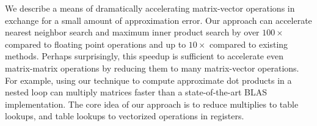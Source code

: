 
We describe a means of dramatically accelerating matrix-vector operations in exchange for a small amount of approximation error. Our approach can accelerate nearest neighbor search and maximum inner product search by over $100\times$ compared to floating point operations and up to $10\times$ compared to existing methods. Perhaps surprisingly, this speedup is sufficient to accelerate even matrix-matrix operations by reducing them to many matrix-vector operations. For example, using our technique to compute approximate dot products in a nested loop can multiply matrices faster than a state-of-the-art BLAS implementation. The core idea of our approach is to reduce multiplies to table lookups, and table lookups to vectorized operations in registers.
